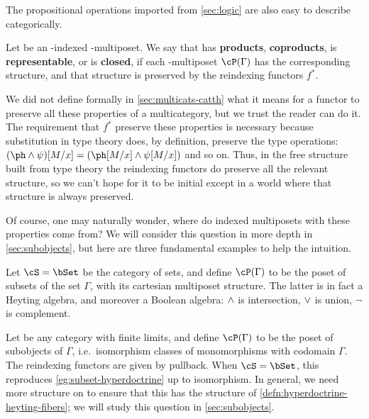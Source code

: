 The propositional operations imported from \cref{sec:logic} are also easy to describe categorically.

\begin{defn}\label{defn:hyperdoctrine-heyting-fibers}
  Let \cP be an \cS-indexed \fS-multiposet.
  We say that \cP has \textbf{products}, \textbf{coproducts}, is \textbf{representable}, or is \textbf{closed}, if each \fS-multiposet $\cP(\Gamma)$ has the corresponding structure, and that structure is preserved by the reindexing functors $f^*$.
\end{defn}

We did not define formally in \cref{sec:multicats-catth} what it means for a functor to preserve all these properties of a multicategory, but we trust the reader can do it.
The requirement that $f^*$ preserve these properties is necessary because substitution in type theory does, by definition, preserve the type operations: $(\ph\meet\psi)[M/x] = (\ph[M/x] \meet \psi[M/x])$ and so on.
Thus, in the free structure built from type theory the reindexing functors do preserve all the relevant structure, so we can't hope for it to be initial except in a world where that structure is always preserved.

Of course, one may naturally wonder, where do indexed multiposets with these properties come from?
We will consider this question in more depth in \cref{sec:subobjects}, but here are three fundamental examples to help the intuition.

\begin{eg}\label{eg:subset-hyperdoctrine}
  Let $\cS=\bSet$ be the category of sets, and define $\cP(\Gamma)$ to be the poset of subsets of the set $\Gamma$, with its cartesian multiposet structure.
  The latter is in fact a Heyting algebra, and moreover a Boolean algebra: $\wedge$ is intersection, $\vee$ is union, $\neg$ is complement.
\end{eg}

\begin{eg}\label{eg:subobject-hyperdoctrine}
  Let \cS be any category with finite limits, and define $\cP(\Gamma)$ to be the poset of subobjects of $\Gamma$, i.e.\ isomorphism classes of monomorphisms with codomain $\Gamma$.
  The reindexing functors are given by pullback.
  When $\cS=\bSet$, this reproduces \cref{eg:subset-hyperdoctrine} up to isomorphism.
  In general, we need more structure on \cS to ensure that this \cP has the structure of \cref{defn:hyperdoctrine-heyting-fibers}; we will study this question in \cref{sec:subobjects}.
\end{eg}


